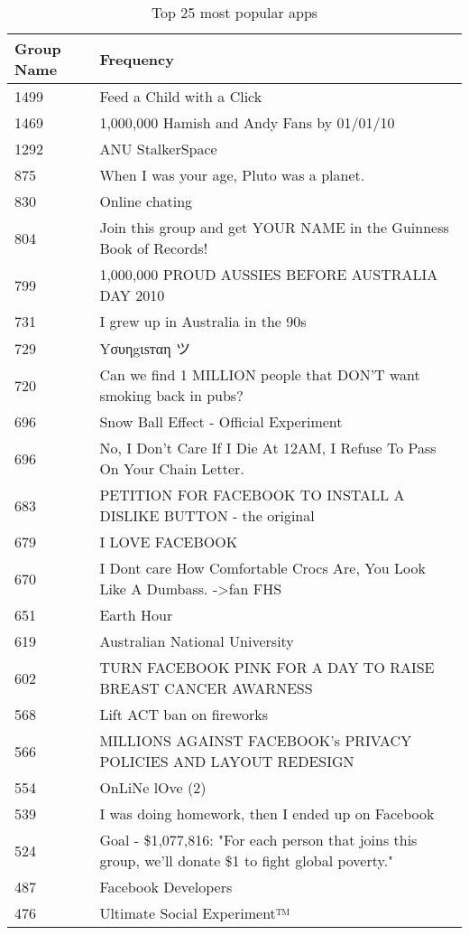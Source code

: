 \begin{table}[!htbp]
\centering
	\begin{tabular}{|l|l|} %
		\hline
		\textbf{Group Name} & \textbf{Frequency}  \\ \hline
		1499 & Feed a Child with a Click  \\ \hline
		1469 & 1,000,000  Hamish and Andy Fans by 01/01/10  \\ \hline
		1292 & ANU StalkerSpace  \\ \hline
		875 & When I was your age, Pluto was a planet.  \\ \hline
		830 & Online chating  \\ \hline
		804 & Join this group and get YOUR NAME in the Guinness Book of Records!  \\ \hline
		799 & 1,000,000 PROUD AUSSIES BEFORE AUSTRALIA DAY 2010  \\ \hline
		731 & I grew up in Australia in the 90s  \\ \hline
		729 & Yσυηgιѕтαη ツ  \\ \hline
		720 & Can we find 1 MILLION people that DON'T want smoking back in pubs?  \\ \hline
		696 & Snow Ball Effect - Official Experiment  \\ \hline
		696 & No, I Don't Care If I Die At 12AM, I Refuse To Pass On Your Chain Letter.  \\ \hline
		683 & PETITION FOR FACEBOOK TO INSTALL A DISLIKE BUTTON - the original  \\ \hline
		679 & I LOVE FACEBOOK  \\ \hline
		670 & I Dont care How Comfortable Crocs Are, You Look Like A Dumbass. ->fan FHS  \\ \hline
		651 & Earth Hour  \\ \hline
		619 & Australian National University  \\ \hline
		602 & TURN FACEBOOK PINK FOR A DAY TO RAISE BREAST CANCER AWARNESS  \\ \hline
		568 & Lift ACT ban on fireworks  \\ \hline
		566 & MILLIONS AGAINST FACEBOOK's PRIVACY POLICIES AND LAYOUT REDESIGN  \\ \hline
		554 & OnLiNe lOve (2)  \\ \hline
		539 & I was doing homework, then I ended up on Facebook  \\ \hline
		524 & Goal - \$1,077,816: "For each person that joins this group, we'll donate \$1 to fight global poverty."  \\ \hline
		487 & Facebook Developers  \\ \hline
		476 & Ultimate Social Experiment™  \\ \hline
	\end{tabular}
	\caption{Top 25 most popular apps}
	\label{tab:revpol}
\end{table}

